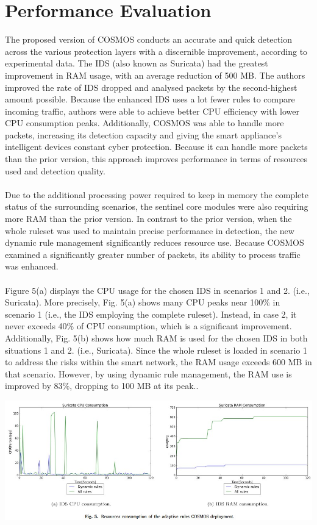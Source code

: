 \documentclass[12pt]{report}
\begin{document}
\section{Performance Evaluation}
\noindent
The proposed version of COSMOS conducts an accurate and quick detection across the various protection layers with a discernible improvement, according to experimental data. The IDS (also known as Suricata) had the greatest improvement in RAM usage, with an average reduction of 500 MB. The authors improved the rate of IDS dropped and analysed packets by the second-highest amount possible. Because the enhanced IDS uses a lot fewer rules to compare incoming traffic, authors were able to achieve better CPU efficiency with lower CPU consumption peaks. Additionally, COSMOS was able to handle more packets, increasing its detection capacity and giving the smart appliance's intelligent devices constant cyber protection. Because it can handle more packets than the prior version, this approach improves performance in terms of resources used and detection quality. 
\\ \\
Due to the additional processing power required to keep in memory the complete status of the surrounding scenarios, the sentinel core modules were also requiring more RAM than the prior version. In contrast to the prior version, when the whole ruleset was used to maintain precise performance in detection, the new dynamic rule management significantly reduces resource use. Because COSMOS examined a significantly greater number of packets, its ability to process traffic was enhanced. 
\\ \\
Figure 5(a) displays the CPU usage for the chosen IDS in scenarios 1 and 2. (i.e., Suricata). More precisely, Fig. 5(a) shows many CPU peaks near 100\% in scenario 1 (i.e., the IDS employing the complete ruleset). Instead, in case 2, it never exceeds 40\% of CPU consumption, which is a significant improvement. Additionally, Fig. 5(b) shows how much RAM is used for the chosen IDS in both situations 1 and 2. (i.e., Suricata). Since the whole ruleset is loaded in scenario 1 to address the risks within the smart network, the RAM usage exceeds 600 MB in that scenario. However, by using dynamic rule management, the RAM use is improved by 83\%, dropping to 100 MB at its peak..
\begin{center}
\includegraphics[scale=0.6]{Fig5.jpg}\\
\end{center}
\end{document}
